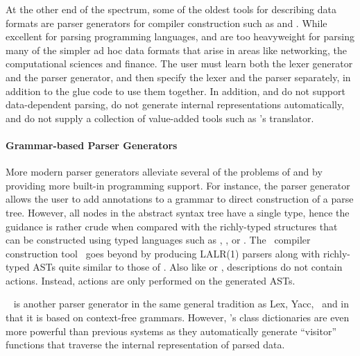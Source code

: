 At the other end of the spectrum,
some of the oldest tools for describing data formats are parser
generators for compiler construction such as \lex{} and \yacc.  While
excellent for parsing programming languages, \lex{} and \yacc{} are
too heavyweight for parsing many of the simpler ad hoc data formats
that arise in areas like networking, the computational sciences and
finance. The user must learn both the lexer generator and the parser
generator, and then specify the lexer and the parser separately, in
addition to the glue code to use them together. In addition, \lex{}
and \yacc{} do not support data-dependent parsing, do not generate
internal representations automatically, and do not supply a collection
of value-added tools such as \padsml's \xml{} translator.

\paragraph*{Grammar-based Parser Generators}
More modern parser generators alleviate several of the
problems of \lex{} and \yacc{} by providing more built-in programming
support.  For instance, the \antlr{} parser generator~\cite{antlr} allows
the user to add annotations to a grammar to direct construction of a
parse tree. However, all nodes in the abstract syntax tree have a 
single type, hence the guidance is rather crude when compared with
the richly-typed structures that can be constructed using
typed languages such as \padsc{}, \padsml{}, \datascript{} or \ddc. 
The \sablecc\ compiler construction
tool~\cite{sablecc} goes beyond
\antlr{} by producing LALR(1) parsers along with richly-typed ASTs
quite similar to those of \padsc{}. Also like \padsc{} or \padsml{}, 
descriptions
do not contain actions. Instead, actions are only performed on the
generated ASTs.

\demeter{}~\cite{lieberherr+:class-dictionaries} is another parser
generator in the same general tradition as Lex, Yacc, \antlr\ and
\sablecc{} in that it is based on context-free grammars.  However,
\demeter{}'s class dictionaries are even more powerful than
previous systems as they
automatically generate ``visitor'' functions that traverse the internal
representation of parsed data.

